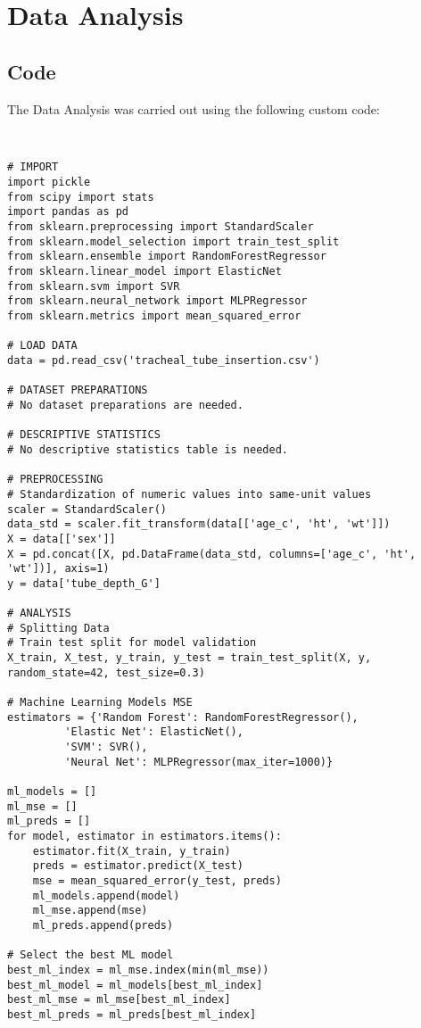 \documentclass[11pt]{article}
\begin{document}
\section{Data Analysis}
\subsection{{Code}}
The Data Analysis was carried out using the following custom code:

\begin{verbatim}


# IMPORT
import pickle
from scipy import stats
import pandas as pd
from sklearn.preprocessing import StandardScaler
from sklearn.model_selection import train_test_split
from sklearn.ensemble import RandomForestRegressor
from sklearn.linear_model import ElasticNet
from sklearn.svm import SVR
from sklearn.neural_network import MLPRegressor
from sklearn.metrics import mean_squared_error

# LOAD DATA
data = pd.read_csv('tracheal_tube_insertion.csv')

# DATASET PREPARATIONS
# No dataset preparations are needed.

# DESCRIPTIVE STATISTICS
# No descriptive statistics table is needed.

# PREPROCESSING 
# Standardization of numeric values into same-unit values
scaler = StandardScaler()
data_std = scaler.fit_transform(data[['age_c', 'ht', 'wt']])
X = data[['sex']]
X = pd.concat([X, pd.DataFrame(data_std, columns=['age_c', 'ht', 'wt'])], axis=1)
y = data['tube_depth_G']

# ANALYSIS
# Splitting Data 
# Train test split for model validation
X_train, X_test, y_train, y_test = train_test_split(X, y, random_state=42, test_size=0.3)

# Machine Learning Models MSE
estimators = {'Random Forest': RandomForestRegressor(), 
         'Elastic Net': ElasticNet(), 
         'SVM': SVR(), 
         'Neural Net': MLPRegressor(max_iter=1000)}

ml_models = []
ml_mse = []
ml_preds = []
for model, estimator in estimators.items():
    estimator.fit(X_train, y_train)
    preds = estimator.predict(X_test)
    mse = mean_squared_error(y_test, preds)
    ml_models.append(model)
    ml_mse.append(mse)
    ml_preds.append(preds)

# Select the best ML model
best_ml_index = ml_mse.index(min(ml_mse))
best_ml_model = ml_models[best_ml_index]
best_ml_mse = ml_mse[best_ml_index]
best_ml_preds = ml_preds[best_ml_index]


\end{verbatim}
\end{document}
